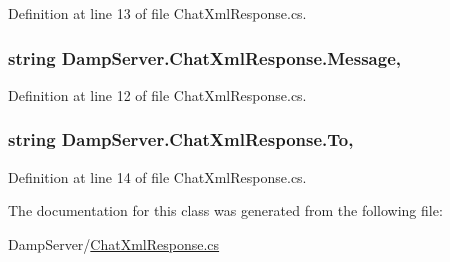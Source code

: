 Definition at line 13 of file Chat\-Xml\-Response.\-cs.

\hypertarget{class_damp_server_1_1_chat_xml_response_af43fcfc48861b155ee9d12c9b33e7cca}{
\subsubsection[{Message}]{\setlength{\rightskip}{0pt plus 5cm}string Damp\-Server.\-Chat\-Xml\-Response.\-Message\hspace{0.3cm}{\ttfamily [get]}, {\ttfamily [set]}}}\label{class_damp_server_1_1_chat_xml_response_af43fcfc48861b155ee9d12c9b33e7cca}


Definition at line 12 of file Chat\-Xml\-Response.\-cs.

\hypertarget{class_damp_server_1_1_chat_xml_response_afda55355aa73ff168a1e26b9331699ed}{
\subsubsection[{To}]{\setlength{\rightskip}{0pt plus 5cm}string Damp\-Server.\-Chat\-Xml\-Response.\-To\hspace{0.3cm}{\ttfamily [get]}, {\ttfamily [set]}}}\label{class_damp_server_1_1_chat_xml_response_afda55355aa73ff168a1e26b9331699ed}


Definition at line 14 of file Chat\-Xml\-Response.\-cs.



The documentation for this class was generated from the following file\-:\begin{DoxyCompactItemize}
\item 
Damp\-Server/\hyperlink{_chat_xml_response_8cs}{Chat\-Xml\-Response.\-cs}\end{DoxyCompactItemize}
